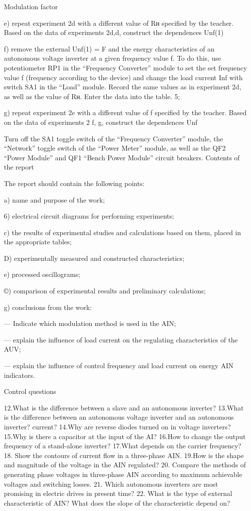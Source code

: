\documentclass[a4paper,14pt]{article}
\begin{document}
Modulation factor


e) repeat experiment 2d with a different value of Rн specified by the teacher. Based on the data of experiments 2d,d, construct the dependences Unf(1)


f) remove the external Unf(1) = F and the energy characteristics of an autonomous voltage inverter at a given frequency value f. To do this, use potentiometer RP1 in the “Frequency Converter” module to set the set frequency value f (frequency according to the device) and change the load current Inf with switch SA1 in the “Load” module. Record the same values as in experiment 2d, as well as the value of Rн.
Enter the data into the table. 5;

g) repeat experiment 2e with a different value of f specified by the teacher. Based on the data of experiments 2 f, g, construct the dependences Unf


Turn off the SA1 toggle switch of the “Frequency Converter” module, the “Network” toggle switch of the “Power Meter” module, as well as the QF2 “Power Module” and QF1 “Bench Power Module” circuit breakers.
Contents of the report

The report should contain the following points:

a) name and purpose of the work;

6) electrical circuit diagrams for performing experiments;

c) the results of experimental studies and calculations based on them,
placed in the appropriate tables;

D) experimentally measured and constructed characteristics;

e) processed oscillograms;

©) comparison of experimental results and preliminary calculations;

g) conclusions from the work:

— Indicate which modulation method is used in the AIN;

— explain the influence of load current on the regulating characteristics of the AUV;

— explain the influence of control frequency and load current on energy
AIN indicators.

Control questions

12.What is the difference between a slave and an autonomous inverter?
13.What is the difference between an autonomous voltage inverter and an autonomous inverter?
current?
14.Why are reverse diodes turned on in voltage inverters?
15.Why is there a capacitor at the input of the AI?
16.How to change the output frequency of a stand-alone inverter?
17.What depends on the carrier frequency?
18. Show the contours of current flow in a three-phase AIN.
19.How is the shape and magnitude of the voltage in the AIN regulated?
20. Compare the methods of generating phase voltages in three-phase AIN according to
maximum achievable voltages and switching losses.
21. Which autonomous inverters are most promising in electric drives in
present time?
22. What is the type of external characteristic of AIN? What does the slope of the characteristic depend on?
\end{document}
